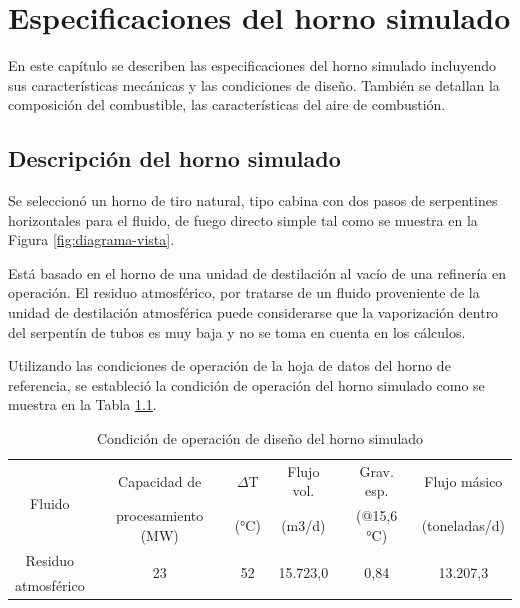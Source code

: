 \chapter{Especificaciones del horno simulado}
\par En este capítulo se describen las especificaciones del horno simulado incluyendo sus características mecánicas y las condiciones de diseño. También se detallan la composición del combustible, las características del aire de combustión.

\section{Descripción del horno simulado}
\par Se seleccionó un horno de tiro natural, tipo cabina con dos pasos de serpentines horizontales para el fluido, de fuego directo simple tal como se muestra en la Figura \ref{fig:diagrama-vista}.
\par Está basado en el horno de una unidad de destilación al vacío de una refinería en operación. El residuo atmosférico, por tratarse de un fluido proveniente de la unidad de destilación atmosférica puede considerarse que la vaporización dentro del serpentín de tubos es muy baja y no se toma en cuenta en los cálculos.
\par Utilizando las condiciones de operación de la hoja de datos del horno de referencia, se estableció la condición de operación del horno simulado como se muestra en la Tabla \ref{tbl:capacidad}.
\begin{table}[H] \centering
\caption[Condición de operación de diseño del horno]
{Condición de operación de diseño del horno simulado}
\label{tbl:capacidad}\begin{tabular}{c|c|c|c|c|c}
\multirow{2}{*}{Fluido} & Capacidad de &
                    $\Delta$T   & Flujo vol. & Grav. esp. & Flujo másico\\
& procesamiento (MW) & (°C)     & (m3/d)     & (@15,6 °C) & (toneladas/d)\\
\hline
Residuo & \multirow{2}{*}{23} & \multirow{2}{*}{52} & 
\multirow{2}{*}{15.723,0} & \multirow{2}{*}{0,84} & \multirow{2}{*}{13.207,3} \\
atmosférico &&&&
\end{tabular}\end{table}
